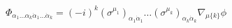 \begin{equation}
\Phi_{\alpha_1\ldots\alpha_k\dot\alpha_1\ldots\dot\alpha_k} =
(-i)^k (\sigma^{\mu_1})_{\alpha_1\dot\alpha_1}\ldots 
       (\sigma^{\mu_k})_{\alpha_k\dot\alpha_k}
       \nabla_{\mu\{k\}} \phi
\label{eq:deriv_scalar}
\end{equation}

